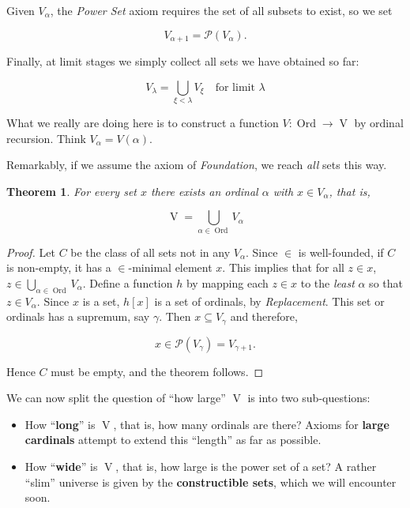 \documentclass{article}
\newcommand{\Ord}{\operatorname{Ord}}
\newcommand{\V}{\Op{V}}
\newcommand{\Op}[1]{\operatorname{#1}}
\newtheorem{theorem}{Theorem}[section]
\begin{document}
Given $V_\alpha$, the \textit{Power Set} axiom requires the set of all subsets to exist, so we set

\begin{equation}
V_{\alpha+1} = \mathcal{P}(V_{\alpha}).
\end{equation}

Finally, at limit stages we simply collect all sets we have obtained so far:

\begin{equation}
V_ \lambda =  \bigcup_{\xi < \lambda} V_\xi \quad \text{for limit } \lambda
\end{equation}

What we really are doing here is to construct a function $V: \Ord \to \V$ by ordinal recursion. Think $V_\alpha = V(\alpha)$.

Remarkably, if we assume the axiom of \textit{Foundation}, we reach \textit{all} sets this way.

\begin{theorem}\label{thm-von-neumann}For every set $x$ there exists an ordinal ${}\alpha$ with $x \in V_\alpha$, that is,

\begin{equation}
\V = \bigcup_{\alpha \in \Ord} V_\alpha
\end{equation}

\end{theorem}\begin{proof}Let $C$ be the class of all sets not in any $V_\alpha$. Since $\in$ is well-founded, if $C$ is non-empty, it has a $\in$-minimal element $x$. This implies that for all $z \in x$, $z \in \bigcup_{\alpha \in \Ord} V_\alpha$. Define a function $h$ by mapping each $z\in x$ to the \textit{least} ${}\alpha$ so that $z \in V_\alpha$. Since $x$ is a set, $h[x]$ is a set of ordinals, by \textit{Replacement}. This set or ordinals has a supremum, say ${}\gamma$. Then $x \subseteq V_\gamma$ and therefore,

\begin{equation}
x \in \mathcal{P}(V_\gamma) = V_{\gamma+1}.
\end{equation}

Hence $C$ must be empty, and the theorem follows.

\end{proof}We can now split the question of ``how large'' $\V$ is into two sub-questions:

\begin{itemize}
\item How ``\textbf{long}'' is $\V$, that is, how many ordinals are there? Axioms for \textbf{large cardinals} attempt to extend this ``length'' as far as possible.
\item How ``\textbf{wide}'' is $\V$, that is, how large is the power set of a set? A rather ``slim'' universe is given by the \textbf{constructible sets}, which we will encounter soon.
\end{itemize}
\end{document}
